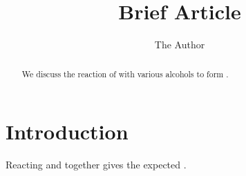 \documentclass[11pt]{article} %
\title{Brief Article}
\author{The Author}
\begin{document}
\maketitle


\begin{abstract}
We discuss the reaction of  with various alcohols to form .
\end{abstract}

\section{Introduction}

Reacting  and  together gives the expected .
\end{document}
